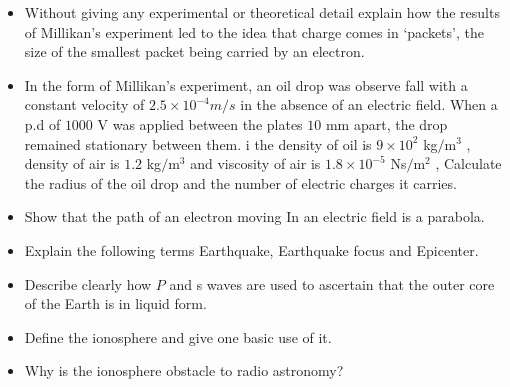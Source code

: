 \documentclass{article}
\begin{document}
\begin{itemize}
\item Without giving any experimental or theoretical detail explain how the results of Millikan’s experiment led to the idea that charge comes in ‘packets’, the size of the smallest packet being carried by an electron. 
\item In the form of Millikan’s experiment, an oil drop was observe fall with a constant velocity of $ 2.5	\times 10^{-4}m/s$ in the absence of an electric field. When a p.d of $ 1000$ V was applied between the plates $ 10$ mm apart, the drop remained stationary between them. i the density of oil is $ 9 \times 10^{2}$ kg$/$m$ ^{3}$ , density of air is $ 1.2$ kg$/$m$ ^{3}$ and viscosity of air is $ 1.8\times 10^{-5}$ Ns$/$m$ ^{2}$ , Calculate the radius of the oil drop and the number of electric charges it carries.
\item Show that the path of an electron moving In an electric field is a parabola.
\item Explain the following terms Earthquake, Earthquake focus and Epicenter.
\item Describe clearly how $ P$ and s waves are used to ascertain that the outer core of the Earth is in liquid form. 
\item Define the ionosphere and give one basic use of it.
\item Why is the ionosphere obstacle to radio astronomy?
\end{itemize}
\end{document}
